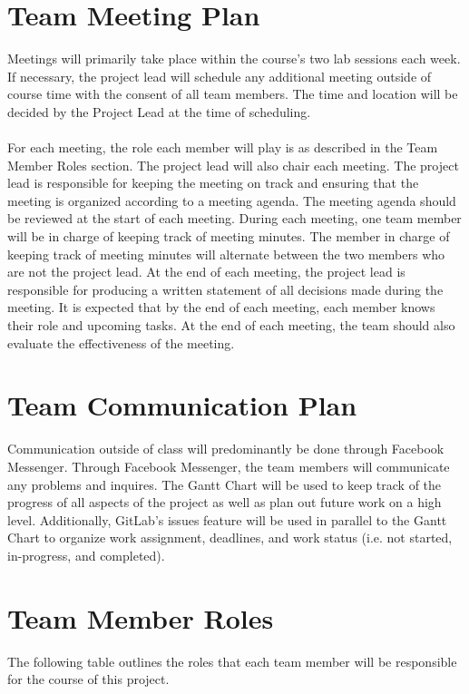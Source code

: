 \documentclass{article}
\begin{document}
\section{Team Meeting Plan}
Meetings will primarily take place within the course's two lab sessions each week. If necessary, the project lead will schedule any additional meeting outside of course time with the consent of all team members. The time and location will be decided by the Project Lead at the time of scheduling. 
\\\\
\noindent For each meeting, the role each member will play is as described in the Team Member Roles section. The project lead will also chair each meeting. The project lead is responsible for keeping the meeting on track and ensuring that the meeting is organized according to a meeting agenda. The meeting agenda should be reviewed at the start of each meeting. During each meeting, one team member will be in charge of keeping track of meeting minutes. The member in charge of keeping track of meeting minutes will alternate between the two members who are not the project lead. At the end of each meeting, the project lead is responsible for producing a written statement of all decisions made during the meeting. It is expected that by the end of each meeting, each member knows their role and upcoming tasks. At the end of each meeting, the team should also evaluate the effectiveness of the meeting.

\section{Team Communication Plan}
Communication outside of class will predominantly be done through Facebook Messenger. Through Facebook Messenger, the team members will communicate any problems and inquires. The Gantt Chart will be used to keep track of the progress of all aspects of the project as well as plan out future work on a high level. Additionally, GitLab's issues feature will be used in parallel to the Gantt Chart to organize work assignment, deadlines, and work status (i.e. not started, in-progress, and completed).

\section{Team Member Roles}
The following table outlines the roles that each team member will be responsible for the course of this project.
\end{document}
